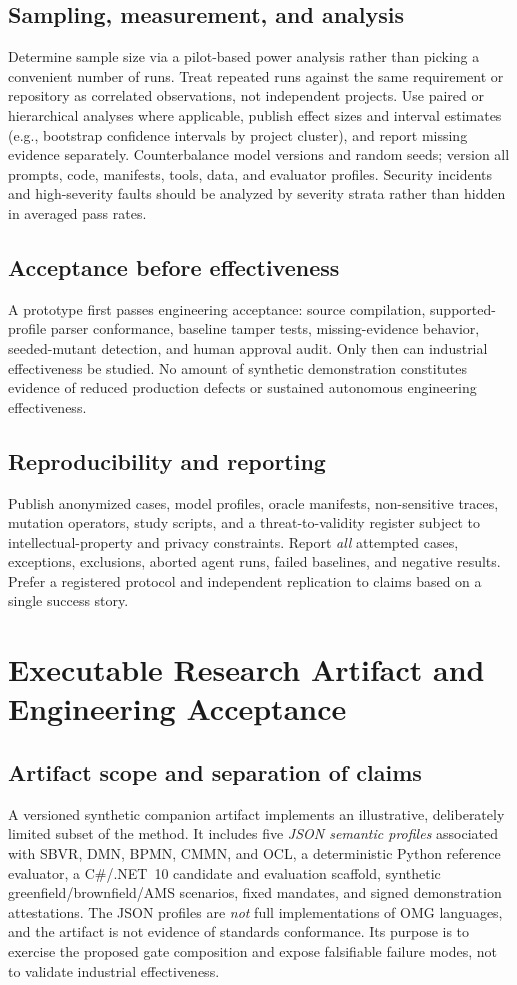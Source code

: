 \documentclass[11pt,a4paper]{article}
\begin{document}
\subsection{Sampling, measurement, and analysis}
Determine sample size via a pilot-based power analysis rather than picking a convenient number of runs. Treat repeated runs against the same requirement or repository as correlated observations, not independent projects. Use paired or hierarchical analyses where applicable, publish effect sizes and interval estimates (e.g., bootstrap confidence intervals by project cluster), and report missing evidence separately. Counterbalance model versions and random seeds; version all prompts, code, manifests, tools, data, and evaluator profiles. Security incidents and high-severity faults should be analyzed by severity strata rather than hidden in averaged pass rates.

\subsection{Acceptance before effectiveness}
A prototype first passes engineering acceptance: source compilation, supported-profile parser conformance, baseline tamper tests, missing-evidence behavior, seeded-mutant detection, and human approval audit. Only then can industrial effectiveness be studied. No amount of synthetic demonstration constitutes evidence of reduced production defects or sustained autonomous engineering effectiveness.

\subsection{Reproducibility and reporting}
Publish anonymized cases, model profiles, oracle manifests, non-sensitive traces, mutation operators, study scripts, and a threat-to-validity register subject to intellectual-property and privacy constraints. Report \emph{all} attempted cases, exceptions, exclusions, aborted agent runs, failed baselines, and negative results. Prefer a registered protocol and independent replication to claims based on a single success story.

\section{Executable Research Artifact and Engineering Acceptance}
\subsection{Artifact scope and separation of claims}
A versioned synthetic companion artifact implements an illustrative, deliberately limited subset of the method. It includes five \emph{JSON semantic profiles} associated with SBVR, DMN, BPMN, CMMN, and OCL, a deterministic Python reference evaluator, a C\#/.NET~10 candidate and evaluation scaffold, synthetic greenfield/brownfield/AMS scenarios, fixed mandates, and signed demonstration attestations. The JSON profiles are \emph{not} full implementations of OMG languages, and the artifact is not evidence of standards conformance. Its purpose is to exercise the proposed gate composition and expose falsifiable failure modes, not to validate industrial effectiveness.
\end{document}
